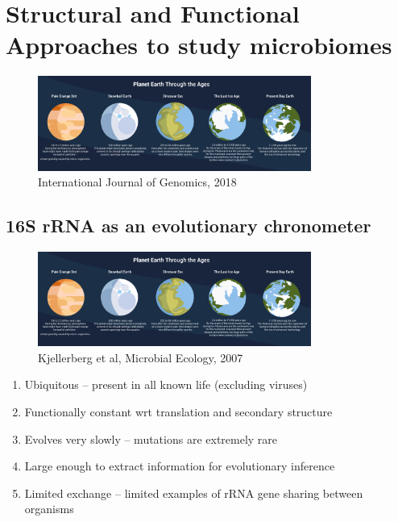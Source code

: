 \documentclass[
]{book}
\providecommand{\tightlist}{%
  \setlength{\itemsep}{0pt}\setlength{\parskip}{0pt}}
\begin{document}
\hypertarget{structural-and-functional-approaches-to-study-microbiomes}{%
\section{Structural and Functional Approaches to study microbiomes}\label{structural-and-functional-approaches-to-study-microbiomes}}

\begin{figure}
\centering
\includegraphics[width=0.8\textwidth,height=\textheight]{./Figures/Planets.png}
\caption{International Journal of Genomics, 2018}
\end{figure}

\hypertarget{s-rrna-as-an-evolutionary-chronometer}{%
\subsection{16S rRNA as an evolutionary chronometer}\label{s-rrna-as-an-evolutionary-chronometer}}

\begin{figure}
\centering
\includegraphics[width=0.8\textwidth,height=\textheight]{./Figures/Planets.png}
\caption{Kjellerberg et al, Microbial Ecology, 2007}
\end{figure}

\begin{enumerate}
\def\labelenumi{\arabic{enumi}.}
\tightlist
\item
  Ubiquitous -- present in all known life (excluding viruses)
\item
  Functionally constant wrt translation and secondary structure
\item
  Evolves very slowly -- mutations are extremely rare
\item
  Large enough to extract information for evolutionary inference
\item
  Limited exchange -- limited examples of rRNA gene sharing between organisms
\end{enumerate}
\end{document}
